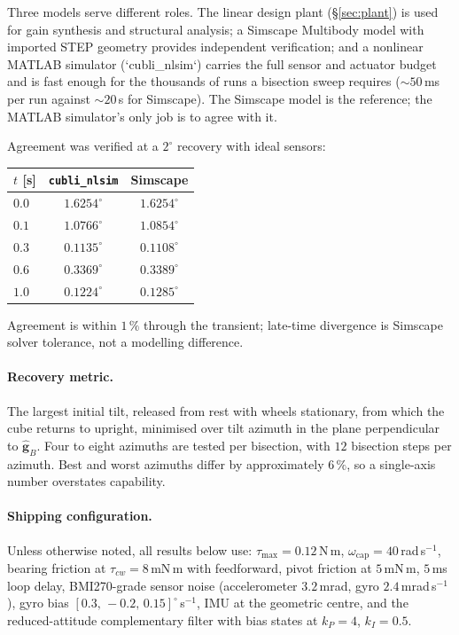 Three models serve different roles. The linear design plant
(\S\ref{sec:plant}) is used for gain synthesis and structural analysis; a
Simscape Multibody model with imported STEP geometry provides independent
verification; and a nonlinear MATLAB simulator (`cubli\_nlsim`) carries the
full sensor and actuator budget and is fast enough for the thousands of runs a
bisection sweep requires (${\sim}50$\,ms per run against ${\sim}20$\,s for
Simscape). The Simscape model is the reference; the MATLAB simulator's only
job is to agree with it.

Agreement was verified at a $2^\circ$ recovery with ideal sensors:

\begin{center}
\small
{}
\label{tab:nlsim-vs-simscape}
\begin{tabular}{@{}lcc@{}}
\toprule
$t$ [s] & \texttt{cubli\_nlsim} & Simscape\\
\midrule
$0.0$ & $1.6254^\circ$ & $1.6254^\circ$\\
$0.1$ & $1.0766^\circ$ & $1.0854^\circ$\\
$0.3$ & $0.1135^\circ$ & $0.1108^\circ$\\
$0.6$ & $0.3369^\circ$ & $0.3389^\circ$\\
$1.0$ & $0.1224^\circ$ & $0.1285^\circ$\\
\bottomrule
\end{tabular}
\end{center}

\noindent
Agreement is within $1\,\%$ through the transient; late-time divergence is
Simscape solver tolerance, not a modelling difference.

\paragraph{Recovery metric.} The largest initial tilt, released from rest with
wheels stationary, from which the cube returns to upright, minimised over tilt
azimuth in the plane perpendicular to $\hat{\bm{g}}_B$. Four to eight
azimuths are tested per bisection, with $12$ bisection steps per azimuth.
Best and worst azimuths differ by approximately $6\,\%$, so a single-axis
number overstates capability.

\paragraph{Shipping configuration.} Unless otherwise noted, all results below
use: $\tau_{\max} = 0.12$\,N\,m, $\omega_{\mathrm{cap}} = 40$\,rad\,s$^{-1}$,
bearing friction at $\tau_{cw} = 8$\,mN\,m with feedforward, pivot friction at
$5$\,mN\,m, $5$\,ms loop delay, BMI270-grade sensor noise (accelerometer
$3.2$\,mrad, gyro $2.4$\,mrad\,s$^{-1}$), gyro bias
$[0.3,\,-0.2,\,0.15]^\circ$\,s$^{-1}$, IMU at the geometric centre, and the
reduced-attitude complementary filter with bias states at $k_P = 4$,
$k_I = 0.5$.

